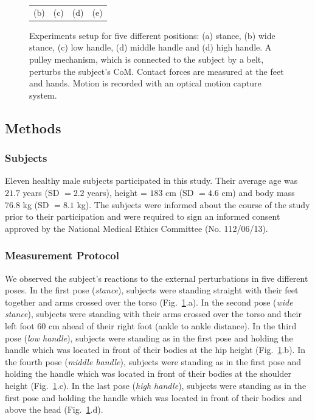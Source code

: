 \begin{figure}
\begin{tabular}{cccc}
    (b) & (c) & (d) & (e)
  \end{tabular}
  \caption{Experiments setup for five different positions: (a) stance, (b)
    wide stance, (c) low handle, (d) middle handle and (d) high handle.  A
    pulley mechanism, which is connected to the subject by a belt, perturbs
    the subject's CoM. Contact forces are measured at the feet and hands.
    Motion is recorded with an optical motion capture system.}
  \label{experimentsetup}
\end{figure}


\subsection{Methods}

\subsubsection{Subjects}

Eleven healthy male subjects participated in this study.  Their average age
was $21.7$ years (SD $=2.2$ years), height = $183$ cm (SD $=4.6$ cm) and body
mass $76.8$ kg (SD $=8.1$ kg).  The subjects were informed about the course of
the study prior to their participation and were required to sign an informed
consent approved by the National Medical Ethics Committee (No. 112/06/13).


\subsubsection{Measurement Protocol}

We observed the subject’s reactions to the external perturbations in five
different poses.  In the first pose (\textit{stance}), subjects were standing
straight with their feet together and arms crossed over the torso
(Fig.~\ref{experimentsetup}.a).  In the second pose (\textit{wide stance}),
subjects were standing with their arms crossed over the torso and their left
foot $60$ cm ahead of their right foot (ankle to ankle distance).  In the
third pose (\textit{low handle}), subjects were standing as in the first pose
and holding the handle which was located in front of their bodies at the hip
height (Fig.~\ref{experimentsetup}.b).  In the fourth pose (\textit{middle
  handle}), subjects were standing as in the first pose and holding the handle
which was located in front of their bodies at the shoulder height
(Fig.~\ref{experimentsetup}.c).  In the last pose (\textit{high handle}),
subjects were standing as in the first pose and holding the handle which was
located in front of their bodies and above the head
(Fig.~\ref{experimentsetup}.d).


